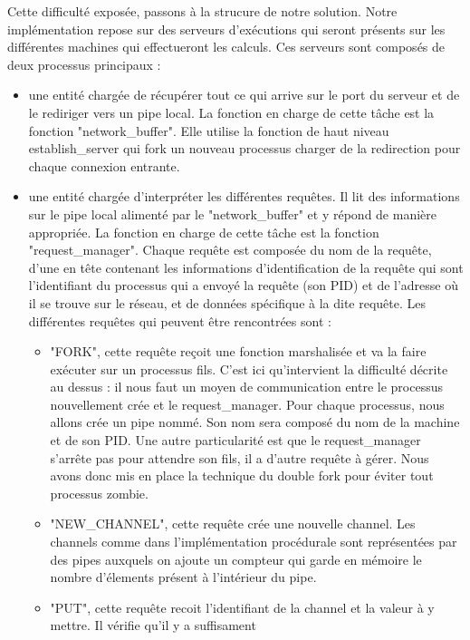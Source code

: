 \documentclass[a4paper, 12pt, twoside]{report}
\begin{document}
Cette difficulté exposée, passons à la strucure de notre solution. Notre implémentation repose sur des serveurs d'exécutions 
qui seront présents sur les différentes machines qui effectueront les calculs. Ces serveurs sont composés de deux processus 
principaux :
\begin{itemize}
  \item une entité chargée de récupérer tout ce qui arrive sur le port du serveur et de le rediriger vers un pipe local.
        La fonction en charge de cette tâche est la fonction "network_buffer". Elle utilise la fonction de haut niveau 
        establish_server qui fork un nouveau processus charger de la redirection pour chaque connexion entrante. 
  \item une entité chargée d'interpréter les différentes requêtes. Il lit des informations sur le pipe local alimenté par le 
        "network_buffer" et y répond de manière appropriée. La fonction en charge de cette tâche est la fonction "request_manager".
        Chaque requête est composée du nom de la requête, d'une 
        en tête contenant les informations d'identification de la requête qui sont l'identifiant du processus qui a 
        envoyé la requête (son PID) et de l'adresse où il se trouve sur le réseau, et de données spécifique à la dite 
        requête. Les différentes requêtes qui peuvent être rencontrées sont :
        \begin{itemize}
          \item "FORK", cette requête reçoit une fonction marshalisée et va la faire exécuter sur un processus fils. C'est ici 
                qu'intervient la difficulté décrite au dessus : il nous faut un moyen de communication entre le processus 
                nouvellement crée et le request_manager. Pour chaque processus, nous allons crée un pipe nommé. Son nom sera 
                composé du nom de la machine et de son PID. Une autre particularité est que le request_manager s'arrête pas 
                pour attendre son fils, il a d'autre requête à gérer. Nous avons donc mis en place la technique du double 
                fork pour éviter tout processus zombie.
          \item "NEW_CHANNEL", cette requête crée une nouvelle channel. Les channels comme dans l'implémentation procédurale
                sont représentées par des pipes auxquels on ajoute un compteur qui garde en mémoire le nombre d'élements 
                présent à l'intérieur du pipe.
          \item "PUT", cette requête recoit l'identifiant de la channel et la valeur à y mettre. Il vérifie qu'il y a suffisament 

\end{itemize}
\end{itemize}
\end{document}
